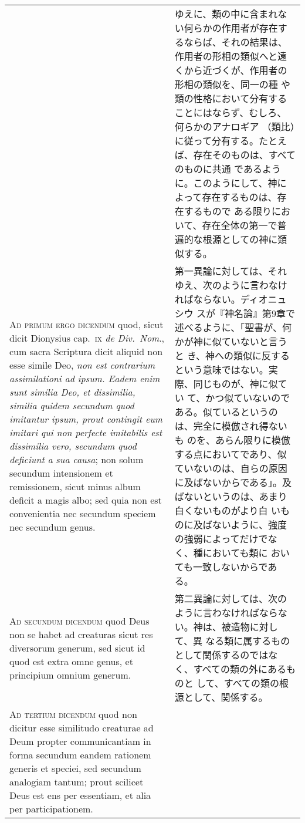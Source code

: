 \documentclass[10pt]{jsarticle} %
\begin{document}
\begin{longtable}{p{21em}p{21em}}
&

ゆえに、類の中に含まれない何らかの作用者が存在するならば、それの結果は、
 作用者の形相の類似へと遠くから近づくが、作用者の形相の類似を、同一の種
 や類の性格において分有することにはならず、むしろ、何らかのアナロギア
 （類比）に従って分有する。たとえば、存在そのものは、すべてのものに共通
 であるように。このようにして、神によって存在するものは、存在するもので
 ある限りにおいて、存在全体の第一で普遍的な根源としての神に類似する。

\\

{\scshape Ad primum ergo dicendum} quod, sicut dicit Dionysius
 cap.~{\scshape ix} {\itshape de Div.~Nom}., cum sacra Scriptura dicit
 aliquid non esse simile Deo, {\itshape non est contrarium assimilationi
 ad ipsum. Eadem enim sunt similia Deo, et dissimilia, similia quidem
 secundum quod imitantur ipsum, prout contingit eum imitari qui non
 perfecte imitabilis est dissimilia vero, secundum quod deficiunt a sua
 causa}; non solum secundum intensionem et remissionem, sicut minus
 album deficit a magis albo; sed quia non est convenientia nec secundum
 speciem nec secundum genus.

&

第一異論に対しては、それゆえ、次のように言わなければならない。ディオニュシウ
 スが『神名論』第9章で述べるように、「聖書が、何かが神に似ていないと言うと
 き、神への類似に反するという意味ではない。実際、同じものが、神に似てい
 て、かつ似ていないのである。似ているというのは、完全に模倣され得ないも
 のを、あらん限りに模倣する点においてであり、似ていないのは、自らの原因
 に及ばないからである」。及ばないというのは、あまり白くないものがより白
 いものに及ばないように、強度の強弱によってだけでなく、種においても類に
 おいても一致しないからである。


\\

{\scshape Ad secundum dicendum} quod Deus non se habet ad creaturas
 sicut res diversorum generum, sed sicut id quod est extra omne genus,
 et principium omnium generum.
&

第二異論に対しては、次のように言わなければならない。神は、被造物に対して、異
 なる類に属するものとして関係するのではなく、すべての類の外にあるものと
 して、すべての類の根源として、関係する。

\\

{\scshape Ad tertium dicendum} quod non dicitur esse similitudo
 creaturae ad Deum propter communicantiam in forma secundum eandem
 rationem generis et speciei, sed secundum analogiam tantum; prout
 scilicet Deus est ens per essentiam, et alia per participationem.


\end{longtable}
\end{document}
